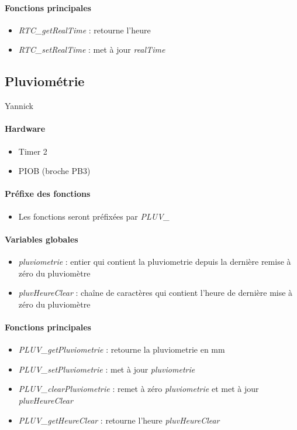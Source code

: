 \documentclass[a4paper]{report}
\begin{document}
\paragraph{Fonctions principales}
\begin{itemize}
\item \emph{RTC\_getRealTime} : retourne l’heure
\item \emph{RTC\_setRealTime} : met à jour \emph{realTime}
\end{itemize}

\subsection{Pluviométrie}
Yannick 
\paragraph{Hardware}
\begin{itemize}
\item Timer 2
\item PIOB (broche PB3)
\end{itemize}
\paragraph{Préfixe des fonctions}
\begin{itemize}
\item Les fonctions seront préfixées par \emph{PLUV\_}
\end{itemize}
\paragraph{Variables globales}
\begin{itemize}
\item \emph{pluviometrie} : entier qui contient la pluviometrie depuis la dernière remise à zéro du pluviomètre
\item \emph{pluvHeureClear} : chaîne de caractères qui contient l’heure de dernière mise à zéro du pluviomètre
\end{itemize}
\paragraph{Fonctions principales}
\begin{itemize}
\item \emph{PLUV\_getPluviometrie} : retourne la pluviometrie en mm
\item \emph{PLUV\_setPluviometrie} : met à jour \emph{pluviometrie}
\item \emph{PLUV\_clearPluviometrie} : remet à zéro \emph{pluviometrie} et met à jour \emph{pluvHeureClear}
\item \emph{PLUV\_getHeureClear} : retourne l’heure \emph{pluvHeureClear}
\end{itemize}
\end{document}
